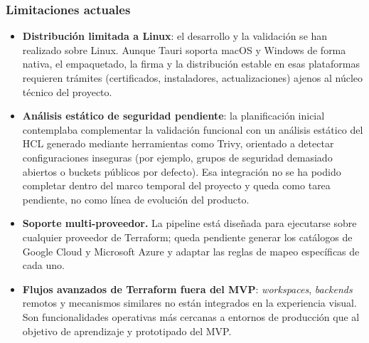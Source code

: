 \documentclass{article}
\begin{document}
{        \subsubsection*{Limitaciones actuales}
        \begin{itemize}[leftmargin=*, itemsep=2pt]
            \item \textbf{Distribución limitada a Linux}: el desarrollo y la
            validación se han realizado sobre Linux. Aunque Tauri soporta
            macOS y Windows de forma nativa, el empaquetado, la firma y la
            distribución estable en esas plataformas requieren trámites
            (certificados, instaladores, actualizaciones) ajenos al núcleo
            técnico del proyecto.
            \item \textbf{Análisis estático de seguridad pendiente}: la
            planificación inicial contemplaba complementar la validación
            funcional con un análisis estático del HCL generado mediante
            herramientas como Trivy, orientado a detectar configuraciones
            inseguras (por ejemplo, grupos de seguridad demasiado abiertos o
            buckets públicos por defecto). Esa integración no se ha podido
            completar dentro del marco temporal del proyecto y queda como
            tarea pendiente, no como línea de evolución del producto.
            \item \textbf{Soporte multi-proveedor.} La pipeline está diseñada
            para ejecutarse sobre cualquier proveedor de Terraform; queda
            pendiente generar los catálogos de Google Cloud y Microsoft Azure
            y adaptar las reglas de mapeo específicas de cada uno.
            \item \textbf{Flujos avanzados de Terraform fuera del MVP}:
            \textit{workspaces}, \textit{backends} remotos y mecanismos
            similares no están integrados en la experiencia visual. Son
            funcionalidades operativas más cercanas a entornos de producción
            que al objetivo de aprendizaje y prototipado del MVP.
        \end{itemize}

}
\end{document}
